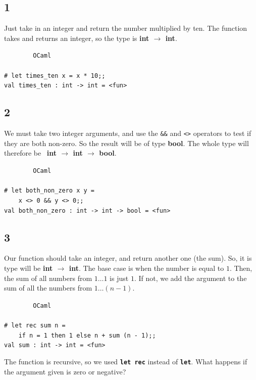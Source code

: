 \documentclass[]{book}
\newcommand{\smspace}{\vspace{4mm}}
\begin{document}
\subsection*{1}
Just take in an integer and return the number multiplied by ten. The function takes and returns an integer, so the type is \textbf{\textsf{int $\rightarrow$ int}}.

\smspace
\noindent\verb!        OCaml!\\
\noindent\\
\noindent\verb!# let times_ten x = x * 10;;!\\
\noindent\verb!val times_ten : int -> int = <fun>!

\subsection*{2}
We must take two integer arguments, and use the \texttt{\&\&} and \texttt{<>} operators to test if they are both non-zero. So the result will be of type \textsf{\textbf{bool}}. The whole type will therefore be \ \textbf{\textsf{int $\rightarrow$ int $\rightarrow$ bool}}.

\smspace
\noindent\verb!        OCaml!\\
\noindent\\
\noindent\verb!# let both_non_zero x y =!\\
\noindent\verb!    x <> 0 && y <> 0;;!\\
\noindent\verb!val both_non_zero : int -> int -> bool = <fun>!

\subsection*{3}
Our function should take an integer, and return another one (the sum). So, it is type will be \textbf{\textsf{int $\rightarrow$ int}}. The base case is when the number is equal to $1$. Then, the sum of all numbers from $1\ldots 1$ is just $1$. If not, we add the argument to the sum of all the numbers from $1\ldots (n - 1)$.

\smspace
\noindent\verb!        OCaml!\\
\noindent\\
\noindent\verb!# let rec sum n =!\\
\noindent\verb!    if n = 1 then 1 else n + sum (n - 1);;!\\
\noindent\verb!val sum : int -> int = <fun>!
\smspace

\noindent The function is recursive, so we used \textbf{\texttt{let rec}} instead of \textbf{\texttt{let}}. What happens if the argument given is zero or negative?
\end{document}
